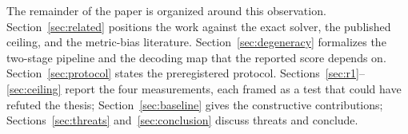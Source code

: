 The remainder of the paper is organized around this observation.
Section~\ref{sec:related} positions the work against the exact solver, the
published ceiling, and the metric-bias literature. Section~\ref{sec:degeneracy}
formalizes the two-stage pipeline and the decoding map that the reported score
depends on. Section~\ref{sec:protocol} states the preregistered protocol.
Sections~\ref{sec:r1}--\ref{sec:ceiling} report the four measurements, each
framed as a test that could have refuted the thesis; Section~\ref{sec:baseline}
gives the constructive contributions; Sections~\ref{sec:threats}
and~\ref{sec:conclusion} discuss threats and conclude.
